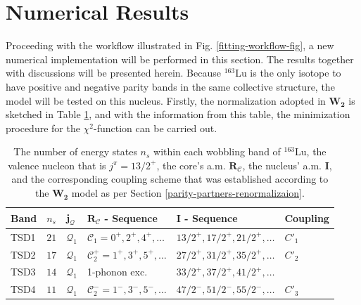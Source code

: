 \section{Numerical Results}

Proceeding with the workflow illustrated in Fig. \ref{fitting-workflow-fig}, a new numerical implementation will be performed in this section. The results together with discussions will be presented herein. Because $^{163}$Lu is the only isotope to have positive and negative parity bands in the same collective structure, the model will be tested on this nucleus. Firstly, the normalization adopted in $\mathbf{W_2}$ is sketched in Table \ref{lu163-table-info}, and with the information from this table, the minimization procedure for the $\chi^2$-function can be carried out.
\begin{table}
    \centering
      \begin{tabular}{llllll}
      \hline
      Band & $n_s$ & $\mathbf{j}_\mathcal{Q}$ & $\mathbf{R}_\mathscr{C}$ - Sequence & $\mathbf{I}$ - Sequence & Coupling  \\
      \hline
      \hline
        TSD1 & $21$ & $\mathcal{Q}_1$ & $\mathscr{C}_1=0^+,2^+,4^+,\dots$   & $13/2^+,17/2^+,21/2^+,\dots$ & $C'_1$        \\
        TSD2 & $17$ & $\mathcal{Q}_1$ & $\mathscr{C}_2^+=1^+,3^+,5^+,\dots$ & $27/2^+,31/2^+,35/2^+,\dots$ & $C'_2$        \\
        TSD3 & $14$ & $\mathcal{Q}_1$ & 1-phonon exc.                       & $33/2^+,37/2^+,41/2^+,\dots$ & \\
        TSD4 & $11$ & $\mathcal{Q}_1$ & $\mathscr{C}_2^-=1^-,3^-,5^-,\dots$ & $47/2^-,51/2^-,55/2^-,\dots$ & $C'_3$        \\
      \hline
    \end{tabular}
    \caption{The number of energy states $n_s$ within each wobbling band of $^{163}$Lu, the valence nucleon that is $j^\pi=13/2^+$, the core's a.m. $\mathbf{R}_\mathscr{C}$, the nucleus' a.m. $\mathbf{I}$, and the corresponding coupling scheme that was established according to the $\mathbf{W_2}$ model as per Section \ref{parity-partners-renormalizaion}.}
    \label{lu163-table-info}
\end{table}

